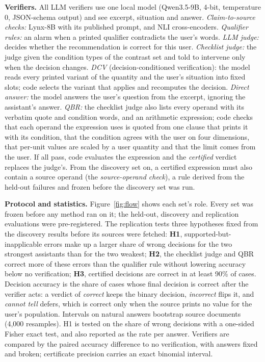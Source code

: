 \documentclass[11pt,letterpaper]{article}
\begin{document}
\textbf{Verifiers.} All LLM verifiers use one local model (Qwen3.5-9B, 4-bit, temperature 0, JSON-schema output) and see excerpt, situation and answer. \emph{Claim-to-source checks:} Lynx-8B \citep{lynx_paper} with its published prompt, and NLI cross-encoders. \emph{Qualifier rules:} an alarm when a printed qualifier contradicts the user's words. \emph{LLM judge:} decides whether the recommendation is correct for this user. \emph{Checklist judge:} the judge given the condition types of the contrast set and told to intervene only when the decision changes. \emph{DCV} (decision-conditioned verification): the model reads every printed variant of the quantity and the user's situation into fixed slots; code selects the variant that applies and recomputes the decision. \emph{Direct answer:} the model answers the user's question from the excerpt, ignoring the assistant's answer. \emph{QBR:} the checklist judge also lists every operand with its verbatim quote and condition words, and an arithmetic expression; code checks that each operand the expression uses is quoted from one clause that prints it with its condition, that the condition agrees with the user on four dimensions, that per-unit values are scaled by a user quantity and that the limit comes from the user. If all pass, code evaluates the expression and the \emph{certified} verdict replaces the judge's. From the discovery set on, a certified expression must also contain a source operand (the \emph{source-operand check}), a rule derived from the held-out failures and frozen before the discovery set was run.

\textbf{Protocol and statistics.} Figure~\ref{fig:flow} shows each set's role. Every set was frozen before any method ran on it; the held-out, discovery and replication evaluations were pre-registered. The replication tests three hypotheses fixed from the discovery results before its sources were fetched: \textbf{H1}, supported-but-inapplicable errors make up a larger share of wrong decisions for the two strongest assistants than for the two weakest; \textbf{H2}, the checklist judge and QBR correct more of these errors than the qualifier rule without lowering accuracy below no verification; \textbf{H3}, certified decisions are correct in at least 90\% of cases. Decision accuracy is the share of cases whose final decision is correct after the verifier acts: a verdict of \emph{correct} keeps the binary decision, \emph{incorrect} flips it, and \emph{cannot tell} defers, which is correct only when the source prints no value for the user's population. Intervals on natural answers bootstrap source documents (4,000 resamples). H1 is tested on the share of wrong decisions with a one-sided Fisher exact test, and also reported as the rate per answer. Verifiers are compared by the paired accuracy difference to no verification, with answers fixed and broken; certificate precision carries an exact binomial interval.
\end{document}
